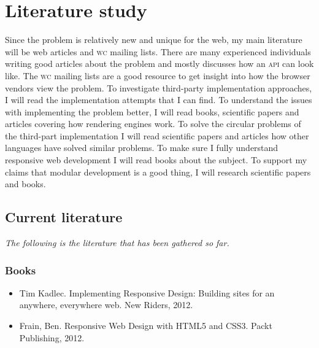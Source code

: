 \documentclass[oneside,a4paper,11pt]{kth-mag}
\begin{document}
\section*{Literature study}
Since the problem is relatively new and unique for the web, my main literature will be web articles and \textsc{w}\textsc{c} mailing lists. There are many experienced individuals writing good articles about the problem and mostly discusses how an \textsc{api} can look like. The \textsc{w}\textsc{c} mailing lists are a good resource to get insight into how the browser vendors view the problem. To investigate third-party implementation approaches, I will read the implementation attempts that I can find. To understand the issues with implementing the problem better, I will read books, scientific papers and articles covering how rendering engines work. To solve the circular problems of the third-part implementation I will read scientific papers and articles how other languages have solved similar problems. To make sure I fully understand responsive web development I will read books about the subject. To support my claims that modular development is a good thing, I will research scientific papers and books.

\subsection*{Current literature}
\emph{The following is the literature that has been gathered so far.}
\subsubsection*{Books}
\begin{itemize}
\item Tim Kadlec. Implementing Responsive Design: Building sites for an anywhere, everywhere web. New Riders, 2012.
\item Frain, Ben. Responsive Web Design with HTML5 and CSS3. Packt Publishing, 2012.
\end{itemize}
\end{document}
